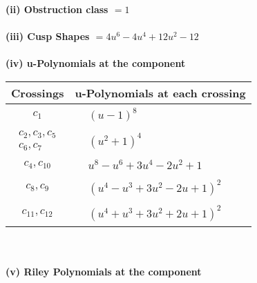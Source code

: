 \documentclass[1p]{elsarticle_modified}
\theoremstyle{definition}
\begin{document}
\flushleft \textbf{(ii) Obstruction class $= 1$}\\~\\
\flushleft \textbf{(iii) Cusp Shapes $= 4 u^6-4 u^4+12 u^2-12$}\\~\\
\newpage\renewcommand{\arraystretch}{1}
\flushleft \textbf{(iv) u-Polynomials at the component}\newline \\
\begin{tabular}{m{50pt}|m{274pt}}
Crossings & \hspace{64pt}u-Polynomials at each crossing \\
\hline $$\begin{aligned}c_{1}\end{aligned}$$&$\begin{aligned}
&(u-1)^8
\end{aligned}$\\
\hline $$\begin{aligned}c_{2},c_{3},c_{5}\\c_{6},c_{7}\end{aligned}$$&$\begin{aligned}
&(u^2+1)^4
\end{aligned}$\\
\hline $$\begin{aligned}c_{4},c_{10}\end{aligned}$$&$\begin{aligned}
&u^8- u^6+3 u^4-2 u^2+1
\end{aligned}$\\
\hline $$\begin{aligned}c_{8},c_{9}\end{aligned}$$&$\begin{aligned}
&(u^4- u^3+3 u^2-2 u+1)^2
\end{aligned}$\\
\hline $$\begin{aligned}c_{11},c_{12}\end{aligned}$$&$\begin{aligned}
&(u^4+u^3+3 u^2+2 u+1)^2
\end{aligned}$\\
\hline
\end{tabular}\\~\\
\newpage\renewcommand{\arraystretch}{1}
\flushleft \textbf{(v) Riley Polynomials at the component}\newline \\
\end{document}
